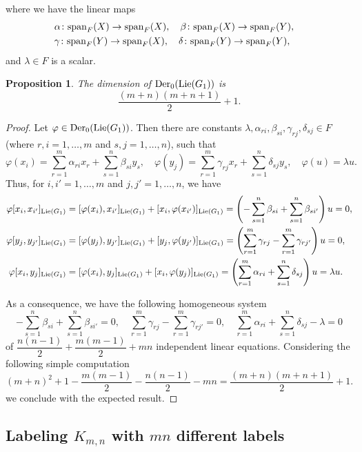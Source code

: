 \documentclass[12pt]{amsart}
\newtheorem{proposition}[teo]{Proposition}
\begin{document}
where we have the linear maps
\begin{eqnarray*}
&\alpha\colon{\rm span}_F(X)\to{\rm span}_F(X),\quad\beta\colon{\rm span}_F(X)\to{\rm span}_F(Y),&\\
&\gamma\colon{\rm span}_F(Y)\to{\rm span}_F(X),\quad\delta\colon{\rm span}_F(Y)\to{\rm span}_F(Y),&
\end{eqnarray*}
and $\lambda\in F$ is a scalar.

\begin{proposition}
The dimension of ${\rm Der}_0({\rm Lie}(G_1))$ is 
\[
\dfrac{(m+n)(m+n+1)}{2}+1.
\]
\end{proposition}

\begin{proof}
Let $\varphi\in {\rm Der}_0({\rm Lie}(G_1))$. Then there are constants $\lambda,\alpha_{ri},\beta_{si},\gamma_{rj},\delta_{sj}\in F$ (where $r,i=1,\dotsc,m$ and $s,j=1,\dotsc,n$), such that
\[
\varphi(x_i)=\sum_{r=1}^m \alpha_{ri}x_r+\sum_{s=1}^n \beta_{si}y_{s},\quad \varphi(y_j)=\sum_{r=1}^m \gamma_{rj}x_r+\sum_{s=1}^n \delta_{sj}y_{s},\quad\varphi(u)=\lambda u.
\]
Thus, for $i,i'=1,\dotsc,m$ and $j,j'=1,\dotsc,n$, we have
\begin{align*}
\varphi[x_i,x_{i'}]_{{\rm Lie}(G_1)}&=[\varphi(x_i),x_{i'}]_{{\rm Lie}(G_1)}+[x_i,\varphi(x_{i'})]_{{\rm Lie}(G_1)}=\left(-\sum_{s=1}^n \beta_{si}+\sum_{s=1}^n \beta_{si'}\right)u=0,\\
\varphi[y_j,y_{j'}]_{{\rm Lie}(G_1)}&=[\varphi(y_j),y_{j'}]_{{\rm Lie}(G_1)}+[y_j,\varphi(y_{j'})]_{{\rm Lie}(G_1)}=\left(\sum_{r=1}^m \gamma_{rj}-\sum_{r=1}^m \gamma_{rj'}\right)u=0,\\
\varphi[x_i,y_j]_{{\rm Lie}(G_1)}&=[\varphi(x_i),y_j]_{{\rm Lie}(G_1)}+[x_i,\varphi(y_j)]_{{\rm Lie}(G_1)}=\left(\sum_{r=1}^m\alpha_{ri}+\sum_{s=1}^n \delta_{sj}\right)u=\lambda u.
\end{align*}

As a consequence, we have the following homogeneous system 
\[
\displaystyle{-\sum_{s=1}^n \beta_{si}+\sum_{s=1}^n \beta_{si'}=0},\quad 
\displaystyle{\sum_{r=1}^m \gamma_{rj}-\sum_{r=1}^m \gamma_{rj'}=0},\quad
\displaystyle{\sum_{r=1}^m \alpha_{ri}+\sum_{s=1}^n \delta_{sj}-\lambda=0}
\]
of $\dfrac{n(n-1)}{2}+\dfrac{m(m-1)}{2}+mn$ independent linear equations. Considering the following simple computation
\[
(m+n)^2+1-\dfrac{m(m-1)}{2}-\dfrac{n(n-1)}{2}-mn=\dfrac{(m+n)(m+n+1)}{2}+1.
\]
we conclude with the expected result.
\end{proof}


\subsection{Labeling $K_{m,n}$ with $mn$ different labels}\label{ssec:kmn}
\end{document}
